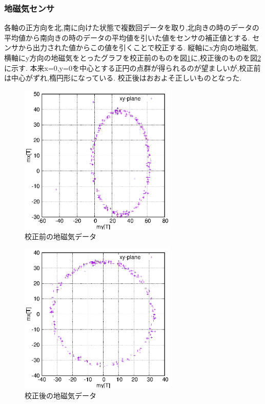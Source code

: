 \documentclass[12pt,oneside]{sotsuken_paper}
\begin{document}
\subsubsection{地磁気センサ}
各軸の正方向を北,南に向けた状態で複数回データを取り,北向きの時のデータの平均値から南向きの時のデータの平均値を引いた値をセンサの補正値とする.
センサから出力された値からこの値を引くことで校正する.
縦軸にx方向の地磁気,横軸にy方向の地磁気をとったグラフを校正前のものを図\ref{fig:mag-calib-be}に,校正後のものを図\ref{fig:mag-calib-af}に示す.
本来x=0,y=0を中心とする正円の点群が得られるのが望ましいが,校正前は中心がずれ,楕円形になっている.
校正後はおおよそ正しいものとなった.

\begin{figure}[htbp]
	\begin{center}
		\includegraphics[width=75mm]{image/calibration/mag-calib-be.eps}
		\caption{校正前の地磁気データ}
		\label{fig:mag-calib-be}
	\end{center}
\end{figure}

\begin{figure}[htbp]
	\begin{center}
		\includegraphics[width=75mm]{image/calibration/mag-calib-af.eps}
		\caption{校正後の地磁気データ}
		\label{fig:mag-calib-af}
	\end{center}
\end{figure}
\end{document}
